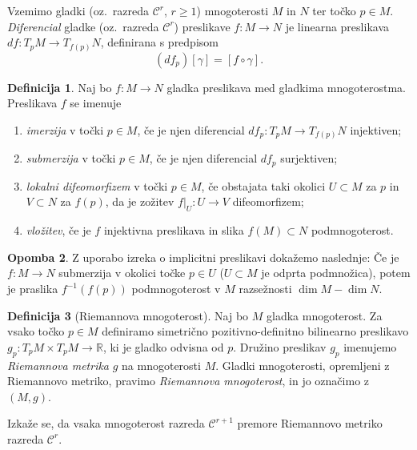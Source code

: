 \documentclass[12pt,a4paper,twoside]{article}
\theoremstyle{definition} %
\newtheorem{definicija}{Definicija}[section]
\newtheorem{opomba}[definicija]{Opomba}
\theoremstyle{plain} %
\numberwithin{equation}{section}  %
\newcommand{\R}{\mathbb R}
\begin{document}
Vzemimo gladki (oz.~razreda $\mathcal{C}^{r}$, $r \geq 1$) mnogoterosti $M$ in $N$ ter točko $p \in M$. \emph{Diferencial} gladke (oz.~razreda $\mathcal{C}^{r}$) preslikave $f \colon M \to N$ je linearna preslikava $df \colon T_{p}M \to T_{f(p)}N$, definirana s predpisom
\begin{equation}
(df_{p})[\gamma] = [f \circ \gamma].
\end{equation}

\begin{definicija}
Naj bo $f \colon M \to N$ gladka preslikava med gladkima mnogoterostma. Preslikava $f$ se imenuje 
\begin{enumerate}
\item \emph{imerzija} v točki $p \in M$, če je njen diferencial $df_{p} \colon T_{p}M \to T_{f(p)}N$ injektiven;
\item \emph{submerzija} v točki $p \in M$, če je njen diferencial $df_{p}$ surjektiven;
\item \emph{lokalni difeomorfizem} v točki $p \in M$, če obstajata taki okolici $U \subset M$ za $p$ in $V \subset N$ za $f(p)$, da je zožitev $f|_{U} \colon U \to V$ difeomorfizem;
\item \emph{vložitev}, če je $f$ injektivna preslikava in slika $f(M) \subset N$ podmnogoterost.
\end{enumerate}
\end{definicija}

\begin{opomba}
Z uporabo izreka o implicitni preslikavi dokažemo naslednje: Če je $f \colon M \to N$ submerzija v okolici točke $p \in U$ ($U \subset M$ je odprta podmnožica), potem je praslika $f^{-1}(f(p))$ podmnogoterost v $M$ razsežnosti $\dim M - \dim N$.
\end{opomba}

\begin{definicija} [Riemannova mnogoterost]
Naj bo $M$ gladka mnogoterost. Za vsako točko $p \in M$ definiramo simetrično pozitivno-definitno bilinearno preslikavo $g_{p} \colon T_{p}M \times T_{p}M \to \R$, ki je gladko odvisna od $p$. Družino preslikav $g_{p}$ imenujemo \emph{Riemannova metrika} $g$ na mnogoterosti $M$.
Gladki mnogoterosti, opremljeni z Riemannovo metriko, pravimo \emph{Riemannova mnogoterost}, in jo označimo z $(M,g)$.
\end{definicija}

Izkaže se, da vsaka mnogoterost razreda $\mathcal{C}^{r+1}$ premore Riemannovo metriko razreda $\mathcal{C}^{r}$.
\end{document}
